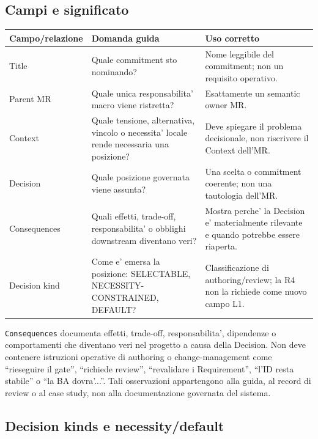 \documentclass[11pt,a4paper]{article}
\begin{document}
\subsection{Campi e significato}

\begin{longtable}{L{35mm}L{48mm}L{60mm}}
\toprule
\textbf{Campo/relazione} & \textbf{Domanda guida} & \textbf{Uso corretto} \\
\midrule\endhead
Title & Quale commitment sto nominando? & Nome leggibile del commitment; non un requisito operativo. \\
Parent MR & Quale unica responsabilita' macro viene ristretta? & Esattamente un semantic owner MR. \\
Context & Quale tensione, alternativa, vincolo o necessita' locale rende necessaria una posizione? & Deve spiegare il problema decisionale, non riscrivere il Context dell'MR. \\
Decision & Quale posizione governata viene assunta? & Una scelta o commitment coerente; non una tautologia dell'MR. \\
Consequences & Quali effetti, trade-off, responsabilita' o obblighi downstream diventano veri? & Mostra perche' la Decision e' materialmente rilevante e quando potrebbe essere riaperta. \\
Decision kind & Come e' emersa la posizione: SELECTABLE, NECESSITY-CONSTRAINED, DEFAULT? & Classificazione di authoring/review; la R4 non la richiede come nuovo campo L1. \\
\bottomrule
\end{longtable}

\begin{ddtacore}[title={Consequences descrive il sistema, non il processo DDTA}]
\texttt{Consequences} documenta effetti, trade-off, responsabilita', dipendenze o comportamenti che diventano veri nel progetto a causa della Decision. Non deve contenere istruzioni operative di authoring o change-management come ``rieseguire il gate'', ``richiede review'', ``revalidare i Requirement'', ``l'ID resta stabile'' o ``la BA dovra'...''. Tali osservazioni appartengono alla guida, al record di review o al case study, non alla documentazione governata del sistema.
\end{ddtacore}

\subsection{Decision kinds e necessity/default}
\end{document}
